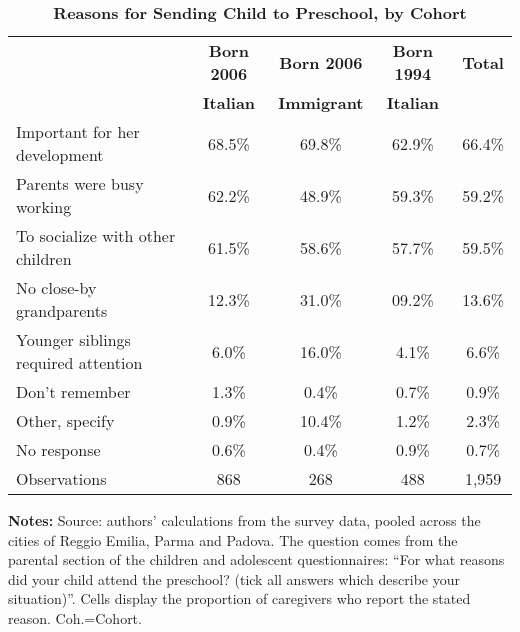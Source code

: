 \begin{table}[ht!]
\caption{\textbf{Reasons for Sending Child to Preschool, by Cohort}}
\label{tab:SumMotiveMaterna}
\begin{center}
 \scriptsize
 \begin{tabular}{ l c c c c }
\hline\hline
& \textbf{Born 2006} & \textbf{Born 2006} & \textbf{Born 1994} & \textbf{Total} \\
& \textbf{Italian} & \textbf{Immigrant} & \textbf{Italian} & \textbf{} \\
\hline
Important for her development       & 68.5\% & 69.8\% & 62.9\% & 66.4\% \\[0.2em]
Parents were busy working           & 62.2\% & 48.9\% & 59.3\% & 59.2\% \\[0.2em]
To socialize with other children    & 61.5\% & 58.6\% & 57.7\% & 59.5\% \\[0.2em]
No close-by grandparents            & 12.3\% & 31.0\% & 09.2\% & 13.6\% \\[0.2em]
Younger siblings required attention &  6.0\% & 16.0\% &  4.1\% &  6.6\% \\[0.2em]
Don't remember                      &  1.3\% &  0.4\% &  0.7\% &  0.9\% \\[0.2em]
Other, specify                      &  0.9\% & 10.4\% &  1.2\% &  2.3\% \\[0.2em]
No response                         &  0.6\% &  0.4\% &  0.9\% &  0.7\% \\
\hline
Observations                        &   868 &   268 &   488 & 1,959 \\
\hline
\end{tabular}
\end{center} \begin{flushleft}
\tiny{{\bfseries Notes:} Source: authors' calculations from the survey data, pooled across the cities of Reggio Emilia, Parma and Padova. The question comes from the parental section of the children and adolescent questionnaires: ``For what reasons did your child attend the preschool? (tick all answers which describe your situation)''. Cells display the proportion of caregivers who report the stated reason. Coh.=Cohort.}
\end{flushleft} \end{table}

